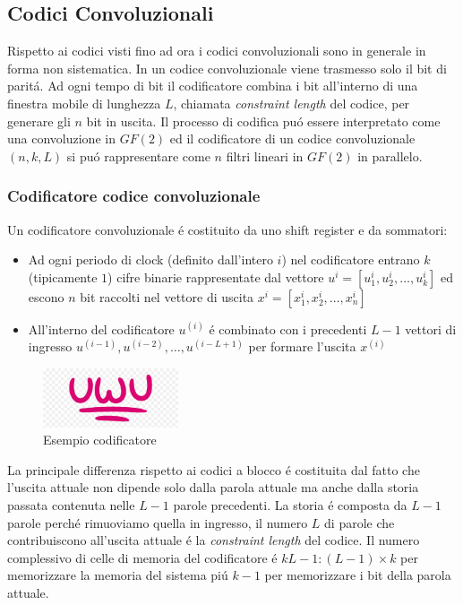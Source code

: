     \subsection{Codici Convoluzionali}
        Rispetto ai codici visti fino ad ora i codici convoluzionali sono in generale in forma non sistematica.
        In un codice convoluzionale viene trasmesso solo il bit di paritá. Ad ogni tempo di bit il codificatore combina i bit
        all'interno di una finestra mobile di lunghezza $L$, chiamata \emph{constraint length} del codice, per generare gli $n$ 
        bit in uscita. Il processo di codifica puó essere interpretato come una convoluzione in $GF(2)$ ed il codificatore di
        un codice convoluzionale $(n,k,L)$ si puó rappresentare come $n$ filtri lineari in $GF(2)$ in parallelo.
        \subsubsection{Codificatore codice convoluzionale}
            Un codificatore convoluzionale é costituito da uno shift register e da sommatori: 
            \begin{itemize}
                \item {
                    \begin{sloppypar}
                        Ad ogni periodo di clock (definito dall'intero $i$) nel codificatore entrano $k$ (tipicamente $1$) cifre binarie 
                        rappresentate dal vettore ${u^{i} = [u^{i}_1,u^{i}_2,\dots,u^{i}_k]}$ ed escono $n$ bit raccolti nel vettore di uscita
                        ${x^{i} = [x^{i}_1,x^{i}_2,\dots,x^{i}_n]}$
                    \end{sloppypar}
                }
                \item {
                    All'interno del codificatore $u^{(i)}$ é combinato con i precedenti $L-1$ vettori di ingresso $u^{(i-1)},u^{(i-2)},\dots,u^{(i-L+1)}$
                    per formare l'uscita $x^{(i)}$
                }
            \end{itemize}
            \begin{figure}[H]
                \centering
                \includegraphics[width = 4cm]{media/uwu.png}
                \caption{Esempio codificatore}
            \end{figure}
            La principale differenza rispetto ai codici a blocco é costituita dal fatto che l'uscita attuale non dipende solo dalla parola attuale ma anche dalla 
            storia passata contenuta nelle $L-1$ parole precedenti. La storia é composta da $L-1$ parole perché rimuoviamo quella in ingresso, il numero $L$ di parole
            che contribuiscono all'uscita attuale é la \emph{constraint length} del codice. Il numero complessivo di celle di memoria del codificatore é $kL-1:(L-1)\times k$
            per memorizzare la memoria del sistema piú $k-1$ per memorizzare i bit della parola attuale.
